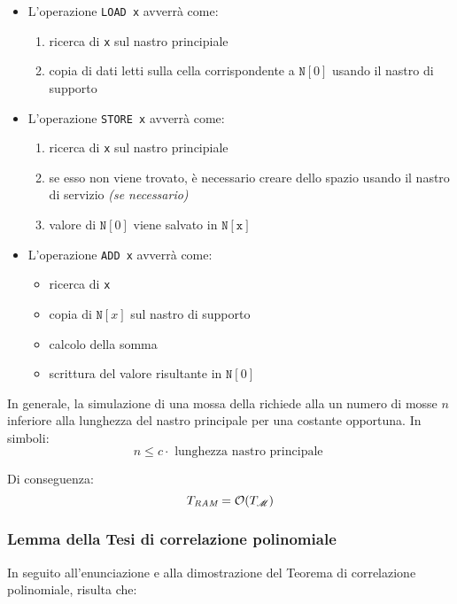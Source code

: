 \documentclass[italian, 10pt]{article}
\begin{document}
\begin{itemize}
  \item L'operazione \texttt{LOAD x} avverrà come:
        \begin{enumerate}
          \item ricerca di \texttt{x} sul nastro principiale
          \item copia  di dati letti sulla cella corrispondente a \(\texttt{N}[0]\) usando il nastro di supporto
        \end{enumerate}
  \item L'operazione \texttt{STORE x} avverrà come:
        \begin{enumerate}
          \item ricerca di \texttt{x} sul nastro principiale
          \item se esso non viene trovato, è necessario creare dello spazio usando il nastro di servizio \textit{(se necessario) }
          \item valore di \(\texttt{N}[0]\) viene salvato in \(\texttt{N}[\texttt{x}]\)
        \end{enumerate}
  \item L'operazione \texttt{ADD x} avverrà come:
        \begin{itemize}
          \item ricerca di \texttt{x}
          \item copia di \(\texttt{N}[x]\) sul nastro di supporto
          \item calcolo della somma
          \item scrittura del valore risultante in \(\texttt{N}[0]\)
        \end{itemize}
\end{itemize}

In generale, la simulazione di una mossa della \RAM richiede alla \TM un numero di mosse \(n\) inferiore alla lunghezza del nastro principale per una costante opportuna.
In simboli:
\[ n \leq c \cdot \text{ lunghezza nastro principale } \]

Di conseguenza:
\[ T_{\textit{RAM}}  = \mathcal{O}(T_{\mathscr{M}}) \]

\subsubsection{Lemma della Tesi di correlazione polinomiale}

In seguito all'enunciazione e alla dimostrazione del Teorema di correlazione polinomiale, risulta che:
\end{document}
